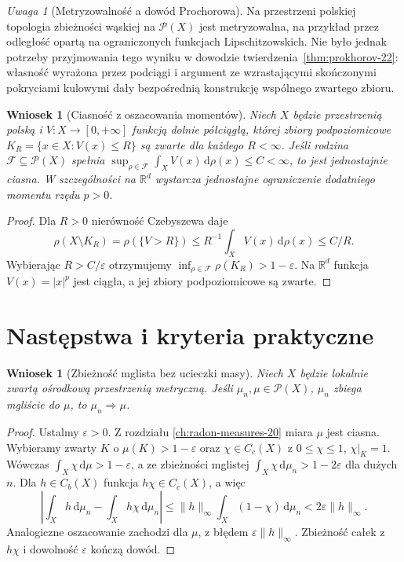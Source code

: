 \documentclass[11pt,a4paper,oneside]{book}
\numberwithin{equation}{chapter}
\theoremstyle{plain}
\newtheorem{wniosek}[twierdzenie]{Wniosek}
\theoremstyle{definition}
\theoremstyle{remark}
\newtheorem{uwaga}[twierdzenie]{Uwaga}
\begin{document}
\begin{uwaga}[Metryzowalność a dowód Prochorowa]
Na przestrzeni polskiej topologia zbieżności wąskiej
na $\mathcal P(X)$ jest metryzowalna, na przykład przez
odległość opartą na ograniczonych funkcjach Lipschitzowskich.
Nie było jednak potrzeby przyjmowania tego wyniku
w dowodzie twierdzenia~\ref{thm:prokhorov-22}:
własność wyrażona przez podciągi i argument ze
wzrastającymi skończonymi pokryciami kulowymi
dały bezpośrednią konstrukcję wspólnego zwartego zbioru.
\end{uwaga}

\begin{wniosek}[Ciasność z oszacowania momentów]
\label{cor:coercive-tight-22}
Niech $X$ będzie przestrzenią polską i
$V:X\to[0,+\infty]$ funkcją dolnie półciągłą,
której zbiory podpoziomicowe
$K_R=\{x\in X:V(x)\le R\}$ są zwarte dla każdego
$R<\infty$. Jeśli rodzina $\mathcal F\subseteq\mathcal P(X)$
spełnia
$\sup_{\rho\in\mathcal F}\int_X V(x)\,\mathrm d\rho(x)
\le C<\infty$, to jest jednostajnie ciasna.
W szczególności na $\mathbb R^d$ wystarcza jednostajne
ograniczenie dodatniego momentu rzędu $p>0$.
\end{wniosek}
\begin{proof}
Dla $R>0$ nierówność Czebyszewa daje
\[
 \rho(X\setminus K_R)=\rho(\{V>R\})
 \le R^{-1}\int_X V(x)\,\mathrm d\rho(x)\le C/R.
\]
Wybierając $R>C/\varepsilon$ otrzymujemy
$\inf_{\rho\in\mathcal F}\rho(K_R)>1-\varepsilon$.
Na $\mathbb R^d$ funkcja $V(x)=|x|^p$ jest ciągła,
a jej zbiory podpoziomicowe są zwarte.
\end{proof}

\section{Następstwa i kryteria praktyczne}
\begin{wniosek}[Zbieżność mglista bez ucieczki masy]
\label{cor:vague-narrow-22}
Niech $X$ będzie lokalnie zwartą ośrodkową
przestrzenią metryczną. Jeśli $\mu_n,\mu\in\mathcal P(X)$,
$\mu_n$ zbiega mgliście do $\mu$, to
$\mu_n\Rightarrow\mu$.
\end{wniosek}
\begin{proof}
Ustalmy $\varepsilon>0$. Z rozdziału
\ref{ch:radon-measures-20} miara $\mu$ jest ciasna.
Wybieramy zwarty $K$ o $\mu(K)>1-\varepsilon$
oraz $\chi\in C_c(X)$ z $0\le\chi\le1$,
$\chi|_K=1$. Wówczas
$\int_X\chi\,\mathrm d\mu>1-\varepsilon$,
a ze zbieżności mglistej
$\int_X\chi\,\mathrm d\mu_n>1-2\varepsilon$
dla dużych $n$. Dla $h\in C_b(X)$
funkcja $h\chi\in C_c(X)$, a więc
\[
\left|\int_Xh\,\mathrm d\mu_n-
\int_Xh\chi\,\mathrm d\mu_n\right|
\le\|h\|_\infty\int_X(1-\chi)\,\mathrm d\mu_n
<2\varepsilon\|h\|_\infty.
\]
Analogiczne oszacowanie zachodzi dla $\mu$,
z błędem $\varepsilon\|h\|_\infty$.
Zbieżność całek z $h\chi$ i dowolność $\varepsilon$
kończą dowód.
\end{proof}
\end{document}
